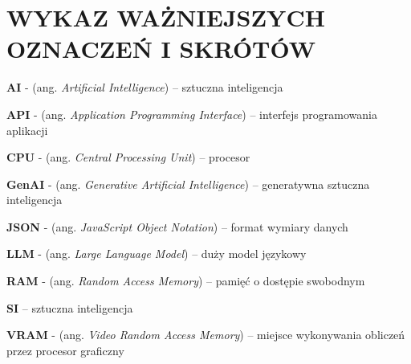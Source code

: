\chapter*{WYKAZ WAŻNIEJSZYCH OZNACZEŃ I SKRÓTÓW}

\textbf{AI} - (ang. \textit{Artificial Intelligence}) -- sztuczna inteligencja


\textbf{API} - (ang. \textit{Application Programming Interface}) -- interfejs programowania aplikacji 


\textbf{CPU} - (ang. \textit{Central Processing Unit}) -- procesor


\textbf{GenAI} - (ang. \textit{Generative Artificial Intelligence}) -- generatywna sztuczna inteligencja


\textbf{JSON} - (ang. \textit{JavaScript Object Notation}) -- format wymiary danych


\textbf{LLM} - (ang. \textit{Large Language Model}) -- duży model językowy


\textbf{RAM} - (ang. \textit{Random Access Memory}) -- pamięć o dostępie swobodnym


\textbf{SI} -- sztuczna inteligencja


\textbf{VRAM} - (ang. \textit{Video Random Access Memory}) -- miejsce wykonywania obliczeń przez procesor graficzny\\